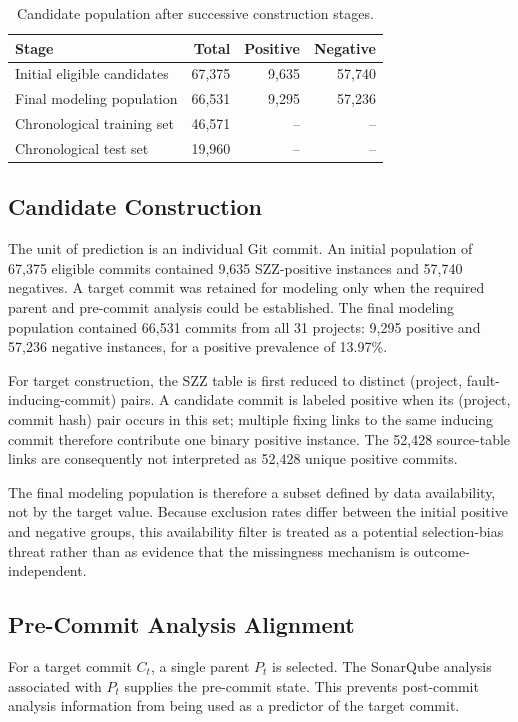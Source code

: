 \documentclass[conference]{IEEEtran}
\begin{document}
\begin{table}[t]
\centering
\caption{Candidate population after successive construction stages.}
\label{tab:filtering}
\small
\begin{tabular}{lrrr}
\toprule
Stage & Total & Positive & Negative\\
\midrule
Initial eligible candidates & 67,375 & 9,635 & 57,740\\
Final modeling population & 66,531 & 9,295 & 57,236\\
Chronological training set & 46,571 & -- & --\\
Chronological test set & 19,960 & -- & --\\
\bottomrule
\end{tabular}
\end{table}

\subsection{Candidate Construction}
The unit of prediction is an individual Git commit. An initial population of 67,375 eligible commits contained 9,635 SZZ-positive instances and 57,740 negatives. A target commit was retained for modeling only when the required parent and pre-commit analysis could be established. The final modeling population contained 66,531 commits from all 31 projects: 9,295 positive and 57,236 negative instances, for a positive prevalence of 13.97\%.

For target construction, the SZZ table is first reduced to distinct (project, fault-inducing-commit) pairs. A candidate commit is labeled positive when its (project, commit hash) pair occurs in this set; multiple fixing links to the same inducing commit therefore contribute one binary positive instance. The 52,428 source-table links are consequently not interpreted as 52,428 unique positive commits.

The final modeling population is therefore a subset defined by data availability, not by the target value. Because exclusion rates differ between the initial positive and negative groups, this availability filter is treated as a potential selection-bias threat rather than as evidence that the missingness mechanism is outcome-independent.

\subsection{Pre-Commit Analysis Alignment}
For a target commit $C_t$, a single parent $P_t$ is selected. The SonarQube analysis associated with $P_t$ supplies the pre-commit state. This prevents post-commit analysis information from being used as a predictor of the target commit.
\end{document}
